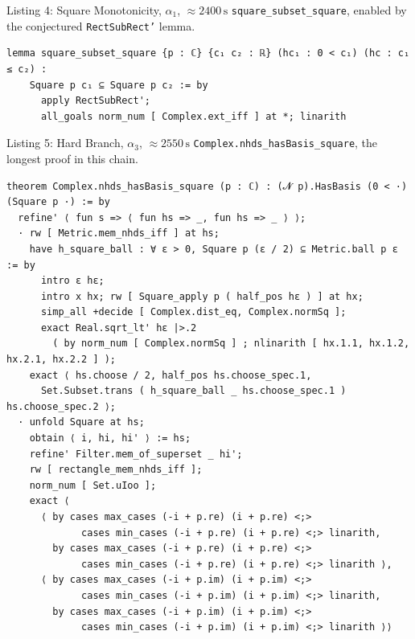 \documentclass[10pt,aspectratio=169]{beamer}
\begin{document}
\begin{frame}[fragile]{Listing 4: Square Monotonicity, $\alpha_1$, $\approx2400\,\mathrm{s}$}
\scriptsize
\texttt{square\_subset\_square}, enabled by the conjectured \texttt{RectSubRect'} lemma.
\begin{lstlisting}[basicstyle=\ttfamily\tiny]
lemma square_subset_square {p : ℂ} {c₁ c₂ : ℝ} (hc₁ : 0 < c₁) (hc : c₁ ≤ c₂) :
    Square p c₁ ⊆ Square p c₂ := by
      apply RectSubRect';
      all_goals norm_num [ Complex.ext_iff ] at *; linarith
\end{lstlisting}
\end{frame}

\begin{frame}[fragile]{Listing 5: Hard Branch, $\alpha_3$, $\approx2550\,\mathrm{s}$}
\scriptsize
\texttt{Complex.nhds\_hasBasis\_square}, the longest proof in this chain.
\begin{lstlisting}[basicstyle=\ttfamily\tiny]
theorem Complex.nhds_hasBasis_square (p : ℂ) : (𝓝 p).HasBasis (0 < ·) (Square p ·) := by
  refine' ⟨ fun s => ⟨ fun hs => _, fun hs => _ ⟩ ⟩;
  · rw [ Metric.mem_nhds_iff ] at hs;
    have h_square_ball : ∀ ε > 0, Square p (ε / 2) ⊆ Metric.ball p ε := by
      intro ε hε;
      intro x hx; rw [ Square_apply p ( half_pos hε ) ] at hx;
      simp_all +decide [ Complex.dist_eq, Complex.normSq ];
      exact Real.sqrt_lt' hε |>.2
        ( by norm_num [ Complex.normSq ] ; nlinarith [ hx.1.1, hx.1.2, hx.2.1, hx.2.2 ] );
    exact ⟨ hs.choose / 2, half_pos hs.choose_spec.1,
      Set.Subset.trans ( h_square_ball _ hs.choose_spec.1 ) hs.choose_spec.2 ⟩;
  · unfold Square at hs;
    obtain ⟨ i, hi, hi' ⟩ := hs;
    refine' Filter.mem_of_superset _ hi';
    rw [ rectangle_mem_nhds_iff ];
    norm_num [ Set.uIoo ];
    exact ⟨
      ⟨ by cases max_cases (-i + p.re) (i + p.re) <;>
             cases min_cases (-i + p.re) (i + p.re) <;> linarith,
        by cases max_cases (-i + p.re) (i + p.re) <;>
             cases min_cases (-i + p.re) (i + p.re) <;> linarith ⟩,
      ⟨ by cases max_cases (-i + p.im) (i + p.im) <;>
             cases min_cases (-i + p.im) (i + p.im) <;> linarith,
        by cases max_cases (-i + p.im) (i + p.im) <;>
             cases min_cases (-i + p.im) (i + p.im) <;> linarith ⟩⟩
\end{lstlisting}
\end{frame}
\end{document}
